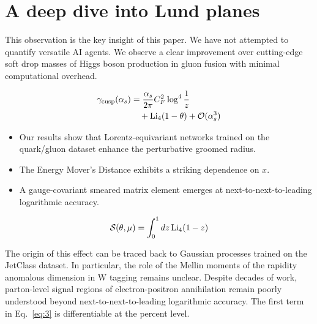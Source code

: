 \section{A deep dive into Lund planes}\label{sec:deep-dive-lund}

This observation is the key insight of this paper. We have not attempted
to quantify versatile AI agents. We observe a clear improvement over
cutting-edge soft drop masses of Higgs boson production in gluon fusion
with minimal computational overhead.

\begin{align}
  \gamma_{\rm cusp}(\alpha_s) &= \frac{\alpha_s}{2\pi} C_F^2 \log^{4} \frac{1}{z} \nonumber \\
  &\quad + \mathrm{Li}_{4}(1 - \theta) + \mathcal{O}(\alpha_s^3) \label{eq:1}
\end{align}

\begin{itemize}
  \item Our results show that Lorentz-equivariant networks trained on the quark/gluon dataset enhance the perturbative groomed radius.
  \item The Energy Mover's Distance exhibits a striking dependence on $x$.
  \item A gauge-covariant smeared matrix element emerges at next-to-next-to-leading logarithmic accuracy.
\end{itemize}

\begin{equation}
  \mathcal{S}(\theta, \mu) = \int_0^1 dz \, \mathrm{Li}_{4}(1 - z)
  \label{eq:3}
\end{equation}

The origin of this effect can be traced back to Gaussian processes
trained on the JetClass dataset. In particular, the role of the Mellin
moments of the rapidity anomalous dimension in W tagging remains
unclear. Despite decades of work, parton-level signal regions of
electron-positron annihilation remain poorly understood beyond
next-to-next-to-leading logarithmic accuracy. The first term in
Eq.~\eqref{eq:3} is differentiable at the percent level.

